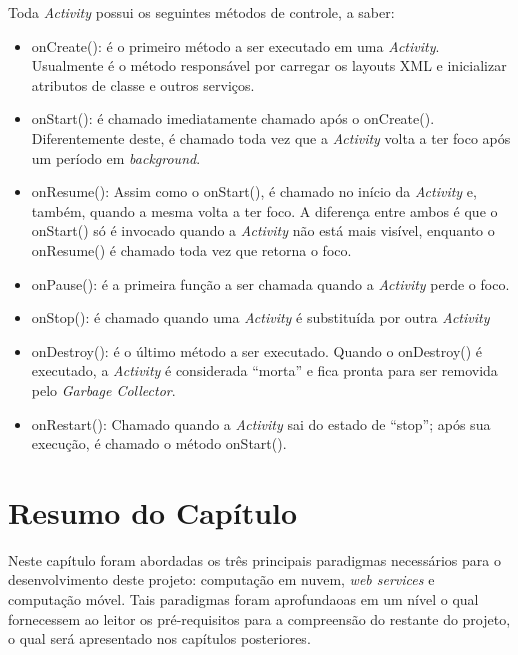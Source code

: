  	Toda \emph{Activity} possui os seguintes métodos de controle, a saber:
 \begin{itemize}
 \item onCreate(): é o primeiro método a ser executado em uma \emph{Activity}. Usualmente é o método responsável por carregar os layouts XML e inicializar atributos de classe e outros serviços.
 \item onStart(): é chamado imediatamente chamado após o onCreate(). Diferentemente deste, é chamado toda vez que a \emph{Activity} volta a ter foco após um período em \emph{background}.
 \item onResume(): Assim como o onStart(), é chamado no início da \emph{Activity} e, também, quando a mesma volta a ter foco. A diferença entre ambos é que o onStart() só é invocado quando a \emph{Activity} não está mais visível, enquanto o onResume() é chamado toda vez que retorna o foco.
 \item onPause(): é a primeira função a ser chamada quando a \emph{Activity} perde o foco.
 \item onStop(): é chamado quando uma \emph{Activity} é substituída por outra \emph{Activity}
 \item onDestroy(): é o último método a ser executado. Quando o onDestroy() é executado, a \emph{Activity} é considerada ``morta'' e fica pronta para ser removida pelo \emph{Garbage Collector}.
 \item	onRestart(): Chamado quando a \emph{Activity} sai do estado de ``stop''; após sua execução, é chamado o método onStart().
 \end{itemize}

 \section{Resumo do Capítulo}

 	Neste capítulo foram abordadas os três principais paradigmas necessários para o desenvolvimento deste projeto: computação em nuvem, \emph{web services} e computação móvel. Tais paradigmas foram aprofundaoas em um nível o qual fornecessem ao leitor os pré-requisitos para a compreensão do restante do projeto, o qual será apresentado nos capítulos posteriores.
 
